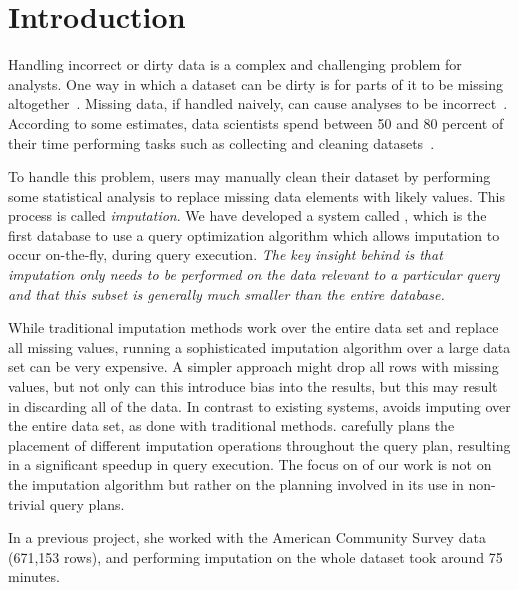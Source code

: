 \section{Introduction}

Handling incorrect or dirty data is a complex and challenging problem for analysts.
One way in which a dataset can be dirty is for parts of it to be missing altogether~\cite{kim2003}.
Missing data, if handled naively, can cause analyses to be incorrect~\cite{rubin1976}.
According to some estimates, data scientists spend between 50 and 80 percent of their time performing tasks such as collecting and cleaning datasets~\cite{data-science-cleaning}.

To handle this problem, users may manually clean their dataset by performing some statistical analysis to replace missing data elements with likely values.
This process is called \emph{imputation}.
We have developed a system called \ProjectName{}, which is the first database to use a query optimization algorithm which allows imputation to occur on-the-fly, during query execution. \emph{The key insight behind \ProjectName{} is that imputation
only needs to be performed on the data relevant to a particular query and
that this subset is generally much smaller than the entire database.} 

While traditional imputation methods work over the entire data set and replace all missing values, running a sophisticated imputation algorithm over a large data set can be very expensive.
A simpler approach might drop all rows with missing values, but not only can this introduce bias into the results, but this may result in discarding all of the data.
In contrast to existing systems, \ProjectName{} avoids imputing over the entire data set, as done with traditional methods. \ProjectName{}
carefully plans the placement of different imputation operations throughout the query plan, resulting in a 
significant speedup in query execution. The focus on of our work is not on the imputation algorithm but rather on the planning involved in its use in non-trivial query plans. 

{In a previous project, she
worked with the American Community Survey data (671,153 rows), and performing imputation on the whole
dataset took around 75 minutes.}

